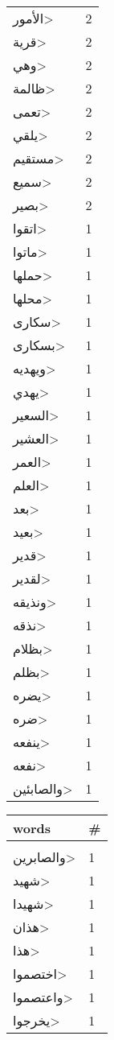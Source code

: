 \documentclass{article}
\begin{document}
\begin{multicols}{6}
\begin{center}
\begin{tabular}{ P{2cm}  P{1cm}}
\<الأمور> & 2 \\ 
\<قرية> & 2 \\ 
\<وهي> & 2 \\ 
\<ظالمة> & 2 \\ 
\<تعمى> & 2 \\ 
\<يلقي> & 2 \\ 
\<مستقيم> & 2 \\ 
\<سميع> & 2 \\ 
\<بصير> & 2 \\ 
\<اتقوا> & 1 \\ 
\<ماتوا> & 1 \\ 
\<حملها> & 1 \\ 
\<محلها> & 1 \\ 
\<سكارى> & 1 \\ 
\<بسكارى> & 1 \\ 
\<ويهديه> & 1 \\ 
\<يهدي> & 1 \\ 
\<السعير> & 1 \\ 
\<العشير> & 1 \\ 
\<العمر> & 1 \\ 
\<العلم> & 1 \\ 
\<بعد> & 1 \\ 
\<بعيد> & 1 \\ 
\<قدير> & 1 \\ 
\<لقدير> & 1 \\ 
\<ونذيقه> & 1 \\ 
\<نذقه> & 1 \\ 
\<بظلام> & 1 \\ 
\<بظلم> & 1 \\ 
\<يضره> & 1 \\ 
\<ضره> & 1 \\ 
\<ينفعه> & 1 \\ 
\<نفعه> & 1 \\ 
\<والصابئين> & 1 \\ 
\end{tabular} 
\begin{tabular}{ P{2cm}  P{1cm}} 
\textbf{words}    & \textbf{\#}  \\
\hline
\\[0.01cm]
\<والصابرين> & 1 \\ 
\<شهيد> & 1 \\ 
\<شهيدا> & 1 \\ 
\<هذان> & 1 \\ 
\<هذا> & 1 \\ 
\<اختصموا> & 1 \\ 
\<واعتصموا> & 1 \\ 
\<يخرجوا> & 1 \\ 

\end{tabular}
\end{center}
\end{multicols}
\end{document}
